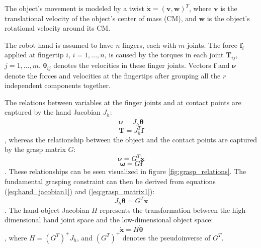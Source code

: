 The object's movement is modeled by a twist $ \boldsymbol{\dot{x}} = (\boldsymbol{v}, \boldsymbol{w})^T $, where
$ \boldsymbol{v} $ is the translational velocity of the object's center of mass (CM), and $ \boldsymbol{w} $ is the
object's rotational velocity around its CM.

The robot hand is assumed to have $ n $ fingers, each with $ m $ joints. The force $ \boldsymbol{f}_i $ applied at
fingertip $ i $, $ i = 1,...,n $, is caused by the torques in each joint $ \boldsymbol{T}_{ij} $, $ j = 1,...,m$.
$ \boldsymbol{\theta}_{ij} $ denotes the velocities in these finger joints. Vectors $ \boldsymbol{f} $ and
$ \boldsymbol{\nu} $ denote the forces and velocities at the fingertips after grouping all the $ r $ independent
components together.

The relations between variables at the finger joints and at contact points are captured by the hand Jacobian
$ J_h $:
\begin{equation} \label{eq:hand_jacobian1}
    \boldsymbol{\nu} = J_h \boldsymbol{\dot{\theta}}
\end{equation}
\begin{equation} \label{eq:hand_jacobian2}
    \boldsymbol{T} = J_h^T \boldsymbol{f}
\end{equation}
, whereas the relationship between the object and the contact points are captured by the grasp matrix $ G $:
\begin{equation} \label{eq:grasp_matrix1}
    \boldsymbol{\nu} = G^T \boldsymbol{\dot{x}}
\end{equation}
\begin{equation} \label{eq:grasp_matrix2}
    \boldsymbol{\omega} = G \boldsymbol{f}
\end{equation}
. These relationships can be seen visualized in figure \ref{fig:grasp_relations}. The fundamental grasping constraint
can then be derived from equations (\ref{eq:hand_jacobian1}) and (\ref{eq:grasp_matrix1}):
\begin{equation} \label{eq:grasp_constraint}
    J_h \boldsymbol{\dot{\theta}} = G^T \boldsymbol{\dot{x}}
\end{equation}
. The hand-object Jacobian $ H $ represents the transformation between the high-dimensional hand joint space and the
low-dimensional object space:
\begin{equation} \label{eq:hand_object_jacobian}
    \boldsymbol{\dot{x}} = H \boldsymbol{\dot{\theta}}
\end{equation}
, where $ H = (G^T)^+ J_h $, and $ (G^T)^+ $ denotes the pseudoinverse of $ G^T $.

